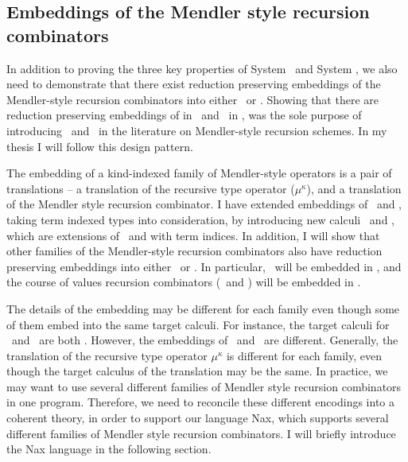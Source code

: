 \subsection{Embeddings of the Mendler style recursion combinators} In
addition to proving the three key properties of System \Fi\ and System
\Fixi, we also need to demonstrate that there exist reduction preserving
embeddings of the Mendler-style recursion combinators into either \Fi\ or
\Fixi. Showing that there are reduction preserving embeddings of \MIt in
\Fw\ and \MPr\ in \Fixw, was the sole purpose of introducing \Fw\ and \Fixw\ in
the literature on Mendler-style recursion schemes. In my thesis
I will follow this design pattern.

The embedding of a kind-indexed family of Mendler-style operators is
a pair of translations -- a translation of the recursive type operator
($\mu^\kappa$), and a translation of the Mendler style recursion combinator. 
I have extended embeddings of \MIt\ and \MPr, taking term indexed
types into consideration, by introducing new calculi \Fi\ and \Fixw,
which are extensions of \Fw\ and \Fixi with term indices. In addition,
I will show that other families of the Mendler-style recursion combinators
also have reduction preserving embeddings into either \Fi\ or \Fixi.
In particular, \MsfIt\ will be embedded in \Fi, and the course of values
recursion combinators (\McvIt\ and \McvPr) will be embedded in \Fixi.

The details of the embedding may be different for each family even though
some of them embed into the same target calculi. For instance, the target
calculi for \MIt\ and \MsfIt\ are both \Fi. However, the embeddings
of \MIt\ and \MsfIt\ are different. Generally, the translation of
the recursive type operator $\mu^\kappa$ is different for each family,
even though the target calculus of the translation may be the same.
In practice, we may want to use several different families of Mendler style
recursion combinators in one program. Therefore, we need to reconcile
these different encodings into a coherent theory, in order
to support our language Nax, which supports several different families of Mendler style
recursion combinators. I will briefly introduce the Nax language
in the following section.

